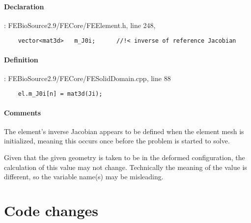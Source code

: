 \documentclass{article}
\begin{document}
    \paragraph{Declaration}: FEBioSource2.9/FECore/FEElement.h, line 248, 
    \begin{lstlisting}
    vector<mat3d>	m_J0i;		//!< inverse of reference Jacobian 
    \end{lstlisting}

    \paragraph{Definition}: FEBioSource2.9/FECore/FESolidDomain.cpp, line 88
    \begin{lstlisting}
    el.m_J0i[n] = mat3d(Ji);
    \end{lstlisting}

    \paragraph{Comments}
    The element's inverse Jacobian appears to be defined when the element mesh is initialized, meaning this occurs once before the problem is started to solve.

    Given that the given geometry is taken to be in the deformed configuration, the calculation of this value may not change.
    Technically the meaning of the value is different, so the variable name(s) may be misleading.


\section*{Code changes}

\printbibliography
\end{document}
